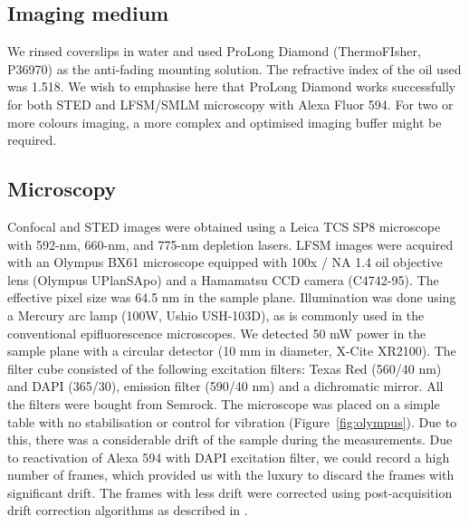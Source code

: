 \documentclass[9pt,twocolumn,twoside]{pnas-new}
\begin{document}
\subsection*{Imaging medium}
We rinsed coverslips in water and used ProLong Diamond (ThermoFIsher, P36970) as the anti-fading mounting solution. The refractive index of the oil used was 1.518. We wish to emphasise here that ProLong Diamond works successfully for both STED and LFSM/SMLM microscopy with Alexa Fluor 594. For two or more colours imaging, a more complex and optimised imaging buffer might be required. 

\subsection*{Microscopy}
Confocal and STED images were obtained using a Leica TCS SP8 microscope with 592-nm, 660-nm, and 775-nm depletion lasers. LFSM images were acquired with an Olympus BX61 microscope equipped with 100x / NA 1.4 oil objective lens (Olympus UPlanSApo) and a Hamamatsu CCD camera (C4742-95). The effective pixel size was 64.5 nm in the sample plane. Illumination was done using a Mercury arc lamp (100W, Ushio USH-103D), as is commonly used in the conventional epifluorescence microscopes. We detected 50 mW power in the sample plane with a circular detector (10 mm in diameter, X-Cite XR2100). The filter cube consisted of the following excitation filters: Texas Red (560/40 nm) and DAPI (365/30), emission filter (590/40 nm) and a dichromatic mirror. All the filters were bought from Semrock. The microscope was placed on a simple table with no stabilisation or control for vibration (Figure~\ref{fig:olympus}). Due to this, there was a considerable drift of the sample during the measurements. Due to reactivation of Alexa 594 with DAPI excitation filter, we could record a high number of frames, which provided us with the luxury to discard the frames with significant drift.  The frames with less drift were corrected using post-acquisition drift correction algorithms as described in \citep{prakash2017investigating, prakash2016periodic}.  
\end{document}

